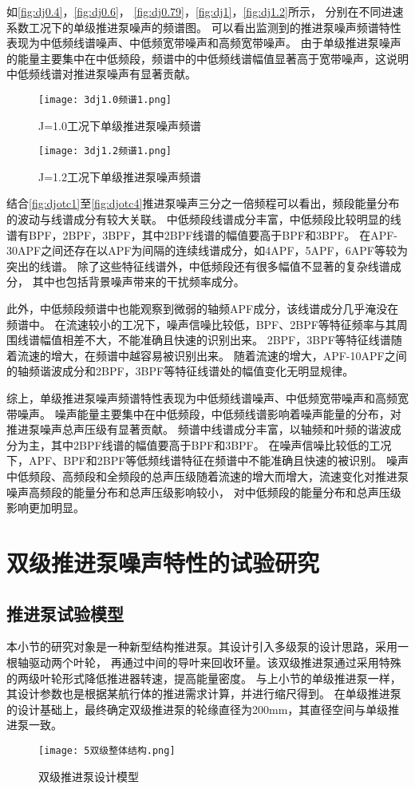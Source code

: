 如\autoref{fig:dj0.4}，\autoref{fig:dj0.6}，
\autoref{fig:dj0.79}，\autoref{fig:dj1}，\autoref{fig:dj1.2}所示，
分别在不同进速系数工况下的单级推进泵噪声的频谱图。
可以看出监测到的推进泵噪声频谱特性表现为中低频线谱噪声、中低频宽带噪声和高频宽带噪声。
由于单级推进泵噪声的能量主要集中在中低频段，频谱中的中低频线谱幅值显著高于宽带噪声，这说明中低频线谱对推进泵噪声有显著贡献。
\begin{figure}[htbp]
    \centering
    \texttt{[image: 3dj1.0频谱1.png]}
    \caption{\label{fig:dj1}J=1.0工况下单级推进泵噪声频谱}
\end{figure}
\begin{figure}[htbp]
    \centering
    \texttt{[image: 3dj1.2频谱1.png]}
    \caption{\label{fig:dj1.2}J=1.2工况下单级推进泵噪声频谱}
\end{figure}

结合\autoref{fig:djotc1}至\autoref{fig:djotc4}推进泵噪声三分之一倍频程可以看出，频段能量分布的波动与线谱成分有较大关联。
中低频段线谱成分丰富，中低频段比较明显的线谱有BPF，2BPF，3BPF，其中2BPF线谱的幅值要高于BPF和3BPF。
在APF-30APF之间还存在以APF为间隔的连续线谱成分，如4APF，5APF，6APF等较为突出的线谱。
除了这些特征线谱外，中低频段还有很多幅值不显著的复杂线谱成分，
其中也包括背景噪声带来的干扰频率成分。

此外，中低频段频谱中也能观察到微弱的轴频APF成分，该线谱成分几乎淹没在频谱中。
在流速较小的工况下，噪声信噪比较低，BPF、2BPF等特征频率与其周围线谱幅值相差不大，不能准确且快速的识别出来。
2BPF，3BPF等特征线谱随着流速的增大，在频谱中越容易被识别出来。
随着流速的增大，APF-10APF之间的轴频谐波成分和2BPF，3BPF等特征线谱处的幅值变化无明显规律。

综上，单级推进泵噪声频谱特性表现为中低频线谱噪声、中低频宽带噪声和高频宽带噪声。
噪声能量主要集中在中低频段，中低频线谱影响着噪声能量的分布，对推进泵噪声总声压级有显著贡献。
频谱中线谱成分丰富，以轴频和叶频的谐波成分为主，其中2BPF线谱的幅值要高于BPF和3BPF。
在噪声信噪比较低的工况下，APF、BPF和2BPF等低频线谱特征在频谱中不能准确且快速的被识别。
噪声中低频段、高频段和全频段的总声压级随着流速的增大而增大，流速变化对推进泵噪声高频段的能量分布和总声压级影响较小，
对中低频段的能量分布和总声压级影响更加明显。

\section{双级推进泵噪声特性的试验研究}
\subsection{推进泵试验模型}
本小节的研究对象是一种新型结构推进泵。其设计引入多级泵的设计思路，采用一根轴驱动两个叶轮，
再通过中间的导叶来回收环量。该双级推进泵通过采用特殊的两级叶轮形式降低推进器转速，提高能量密度。
与上小节的单级推进泵一样，其设计参数也是根据某航行体的推进需求计算，并进行缩尺得到。
在单级推进泵的设计基础上，最终确定双级推进泵的轮缘直径为200mm，其直径空间与单级推进泵一致。
\begin{figure}[htbp]
    \centering
    \texttt{[image: 5双级整体结构.png]}
    \caption{\label{fig:sj_modle}双级推进泵设计模型}
\end{figure}


